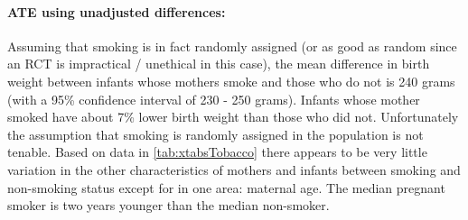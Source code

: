 \documentclass[a4paper, 12pt]{article}
\begin{document}
\paragraph{ATE using unadjusted differences:}
Assuming that smoking is in fact randomly assigned (or as good as random since an RCT is impractical / unethical in this case), the mean difference in birth weight between infants whose mothers smoke and those who do not is 240 grams (with a 95\% confidence interval of 230 - 250 grams). Infants whose mother smoked have about  7\% lower birth weight than those who did not. \newline{}
Unfortunately the assumption that smoking is randomly assigned in the population is not tenable. Based on data in \ref{tab:xtabsTobacco} there appears to be very little variation in the other characteristics of mothers and infants between smoking and non-smoking status except for in one area: maternal age.  The median pregnant smoker is two years younger than the median non-smoker.  


\pagebreak
\end{document}
